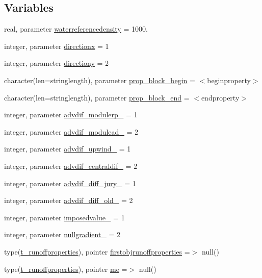 \subsection*{Variables}
\begin{DoxyCompactItemize}
\item 
real, parameter \mbox{\hyperlink{namespacemodulerunoffproperties_af591dffde879824675224a9185932faf}{waterreferencedensity}} = 1000.
\item 
integer, parameter \mbox{\hyperlink{namespacemodulerunoffproperties_ae250a208e96221e662f5c2b12c6d036a}{directionx}} = 1
\item 
integer, parameter \mbox{\hyperlink{namespacemodulerunoffproperties_a158dd89aefcdbd0eb8d119550d0da31d}{directiony}} = 2
\item 
character(len=stringlength), parameter \mbox{\hyperlink{namespacemodulerunoffproperties_a88c569a198ba58f328cbd78702f9b739}{prop\+\_\+block\+\_\+begin}} = \textquotesingle{}$<$beginproperty$>$\textquotesingle{}
\item 
character(len=stringlength), parameter \mbox{\hyperlink{namespacemodulerunoffproperties_a8f76f273640950bb09a9177eeeba3f79}{prop\+\_\+block\+\_\+end}} = \textquotesingle{}$<$endproperty$>$\textquotesingle{}
\item 
integer, parameter \mbox{\hyperlink{namespacemodulerunoffproperties_a760fc37f3c2a03e5f063430e741cc541}{advdif\+\_\+modulerp\+\_\+}} = 1
\item 
integer, parameter \mbox{\hyperlink{namespacemodulerunoffproperties_a33404d52cb5232cc7771cec95096ed37}{advdif\+\_\+modulead\+\_\+}} = 2
\item 
integer, parameter \mbox{\hyperlink{namespacemodulerunoffproperties_a44ce036cbb5b05492ce8077c0669726e}{advdif\+\_\+upwind\+\_\+}} = 1
\item 
integer, parameter \mbox{\hyperlink{namespacemodulerunoffproperties_a543a15f324c935241167973309384dcb}{advdif\+\_\+centraldif\+\_\+}} = 2
\item 
integer, parameter \mbox{\hyperlink{namespacemodulerunoffproperties_af5214297560b3c3bd07eac30d55b87e5}{advdif\+\_\+diff\+\_\+jury\+\_\+}} = 1
\item 
integer, parameter \mbox{\hyperlink{namespacemodulerunoffproperties_a9cda2535b4c47700d56c7acd2ccda7fd}{advdif\+\_\+diff\+\_\+old\+\_\+}} = 2
\item 
integer, parameter \mbox{\hyperlink{namespacemodulerunoffproperties_ac4753cf8e53d379638385636def75840}{imposedvalue\+\_\+}} = 1
\item 
integer, parameter \mbox{\hyperlink{namespacemodulerunoffproperties_a4fac8668d857b78a77b9e1e9a745f2df}{nullgradient\+\_\+}} = 2
\item 
type(\mbox{\hyperlink{structmodulerunoffproperties_1_1t__runoffproperties}{t\+\_\+runoffproperties}}), pointer \mbox{\hyperlink{namespacemodulerunoffproperties_a9264ee8b17d9a5c872f8e2979fca9fb9}{firstobjrunoffproperties}} =$>$ null()
\item 
type(\mbox{\hyperlink{structmodulerunoffproperties_1_1t__runoffproperties}{t\+\_\+runoffproperties}}), pointer \mbox{\hyperlink{namespacemodulerunoffproperties_af88f6b3d96a84a70fa3db48bea40fd64}{me}} =$>$ null()
\end{DoxyCompactItemize}


